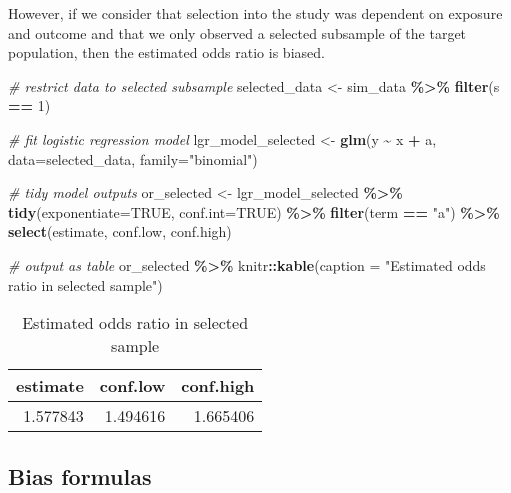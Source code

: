 \documentclass[
]{book}
\newenvironment{Shaded}{\begin{snugshade}}{\end{snugshade}}
\newcommand{\AttributeTok}[1]{\textcolor[rgb]{0.13,0.29,0.53}{#1}}
\newcommand{\CommentTok}[1]{\textcolor[rgb]{0.56,0.35,0.01}{\textit{#1}}}
\newcommand{\ConstantTok}[1]{\textcolor[rgb]{0.56,0.35,0.01}{#1}}
\newcommand{\DecValTok}[1]{\textcolor[rgb]{0.00,0.00,0.81}{#1}}
\newcommand{\FunctionTok}[1]{\textcolor[rgb]{0.13,0.29,0.53}{\textbf{#1}}}
\newcommand{\NormalTok}[1]{#1}
\newcommand{\OtherTok}[1]{\textcolor[rgb]{0.56,0.35,0.01}{#1}}
\newcommand{\SpecialCharTok}[1]{\textcolor[rgb]{0.81,0.36,0.00}{\textbf{#1}}}
\newcommand{\StringTok}[1]{\textcolor[rgb]{0.31,0.60,0.02}{#1}}
\begin{document}
However, if we consider that selection into the study was dependent on exposure and outcome and that we only observed a selected subsample of the target population, then the estimated odds ratio is biased.

\begin{Shaded}
\begin{Highlighting}[]
\CommentTok{\# restrict data to selected subsample}
\NormalTok{selected\_data }\OtherTok{\textless{}{-}}\NormalTok{ sim\_data }\SpecialCharTok{\%\textgreater{}\%} \FunctionTok{filter}\NormalTok{(s }\SpecialCharTok{==} \DecValTok{1}\NormalTok{)}

\CommentTok{\# fit logistic regression model}
\NormalTok{lgr\_model\_selected }\OtherTok{\textless{}{-}} \FunctionTok{glm}\NormalTok{(y }\SpecialCharTok{\textasciitilde{}}\NormalTok{ x }\SpecialCharTok{+}\NormalTok{ a, }\AttributeTok{data=}\NormalTok{selected\_data, }\AttributeTok{family=}\StringTok{"binomial"}\NormalTok{) }

\CommentTok{\# tidy model outputs}
\NormalTok{or\_selected }\OtherTok{\textless{}{-}}\NormalTok{ lgr\_model\_selected }\SpecialCharTok{\%\textgreater{}\%} 
  \FunctionTok{tidy}\NormalTok{(}\AttributeTok{exponentiate=}\ConstantTok{TRUE}\NormalTok{, }\AttributeTok{conf.int=}\ConstantTok{TRUE}\NormalTok{) }\SpecialCharTok{\%\textgreater{}\%} 
  \FunctionTok{filter}\NormalTok{(term }\SpecialCharTok{==} \StringTok{"a"}\NormalTok{) }\SpecialCharTok{\%\textgreater{}\%} 
  \FunctionTok{select}\NormalTok{(estimate, conf.low, conf.high) }

\CommentTok{\# output as table}
\NormalTok{or\_selected }\SpecialCharTok{\%\textgreater{}\%}
\NormalTok{  knitr}\SpecialCharTok{::}\FunctionTok{kable}\NormalTok{(}\AttributeTok{caption =} \StringTok{"Estimated odds ratio in selected sample"}\NormalTok{)}
\end{Highlighting}
\end{Shaded}

\begin{table}

\caption{\label{tab:unnamed-chunk-8}Estimated odds ratio in selected sample}
\centering
\begin{tabular}[t]{r|r|r}
\hline
estimate & conf.low & conf.high\\
\hline
1.577843 & 1.494616 & 1.665406\\
\hline
\end{tabular}
\end{table}

\hypertarget{bias-formulas}{%
\subsection{Bias formulas}\label{bias-formulas}}
\end{document}
